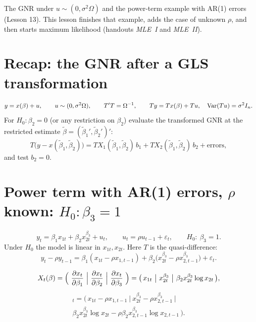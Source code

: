 \documentclass[11pt]{article}
\begin{document}

 The GNR under $u\sim(0,\sigma^{2}\Omega)$ and the power-term example with
AR(1) errors (Lesson 13). This lesson finishes that example, adds the case of
unknown $\rho$, and then starts maximum likelihood (handouts \emph{MLE~I} and \emph{MLE~II}).

\section{Recap: the GNR after a GLS transformation}

\[ y=x(\beta)+u, \qquad u\sim(0,\sigma^{2}\Omega), \qquad T'T=\Omega^{-1}, \qquad
   Ty=Tx(\beta)+Tu, \quad \operatorname{Var}(Tu)=\sigma^{2}I_{n}. \]
For $H_{0}:\beta_{2}=0$ (or any restriction on $\beta_{2}$) evaluate the transformed GNR at the
restricted estimate $\tilde\beta=(\tilde\beta_{1}',\tilde\beta_{2}')'$:
\[ T\bigl(y-x(\tilde\beta_{1},\tilde\beta_{2})\bigr)
   =TX_{1}(\tilde\beta_{1},\tilde\beta_{2})\,b_{1}
   +TX_{2}(\tilde\beta_{1},\tilde\beta_{2})\,b_{2}+\text{errors}, \]
and test $b_{2}=0$.

\section{Power term with AR(1) errors, $\rho$ known: $H_{0}:\beta_{3}=1$}

\[ y_{t}=\beta_{1}x_{1t}+\beta_{2}x_{2t}^{\beta_{3}}+u_{t}, \qquad
   u_{t}=\rho u_{t-1}+\varepsilon_{t}, \qquad H_{0}:\ \beta_{3}=1 . \]
Under $H_{0}$ the model is linear in $x_{1t},x_{2t}$. Here $T$ is the quasi-difference:
\[ y_{t}-\rho y_{t-1}=\beta_{1}(x_{1t}-\rho x_{1,t-1})
   +\beta_{2}\bigl(x_{2t}^{\beta_{3}}-\rho x_{2,t-1}^{\beta_{3}}\bigr)+\varepsilon_{t}. \]

\[ X_{t}(\beta)=\Bigl(\ \frac{\partial x_{t}}{\partial\beta_{1}}\ \Big|\
   \frac{\partial x_{t}}{\partial\beta_{2}}\ \Big|\ \frac{\partial x_{t}}{\partial\beta_{3}}\ \Bigr)
   =\bigl(\,x_{1t}\ \big|\ x_{2t}^{\beta_{3}}\ \big|\ \beta_{2}x_{2t}^{\beta_{3}}\log x_{2t}\,\bigr), \]
\begin{multline*}
 [TX(\beta)]_{t}=\bigl(\,x_{1t}-\rho x_{1,t-1}\ \big|\
   x_{2t}^{\beta_{3}}-\rho x_{2,t-1}^{\beta_{3}}\ \big|\\
   \beta_{2}x_{2t}^{\beta_{3}}\log x_{2t}-\rho\beta_{2}x_{2,t-1}^{\beta_{3}}\log x_{2,t-1}\,\bigr).
\end{multline*}
\end{document}

